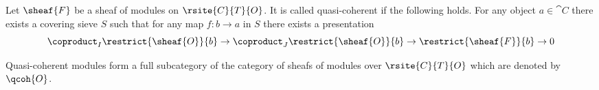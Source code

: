 \begin{definition}
Let $\sheaf{F}$ be a sheaf of modules on $\rsite{C}{T}{O}$.
It is called quasi-coherent if the following holds.
For any object $a\in\cat{C}$ 
there exists a covering sieve $S$ 
such that for any map $f:b\rightarrow a$ in $S$ 
there exists a presentation
\[\coproduct_I \restrict{\sheaf{O}}{b} \rightarrow \coproduct_J \restrict{\sheaf{O}}{b} 
	\rightarrow \restrict{\sheaf{F}}{b} \rightarrow 0\]

Quasi-coherent modules form a full subcategory 
of the category of sheafs of modules over $\rsite{C}{T}{O}$ 
which are denoted by $\qcoh{O}$.
\end{definition}
